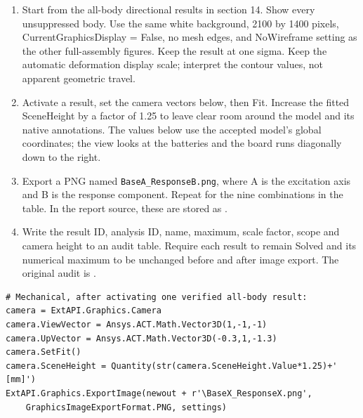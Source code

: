 \documentclass[10pt,a4paper]{article}
\begin{document}
\begin{enumerate}
\item Start from the all-body directional results in section 14. Show every unsuppressed body. Use the same white background, 2100 by 1400 pixels, CurrentGraphicsDisplay = False, no mesh edges, and NoWireframe setting as the other full-assembly figures. Keep the result at one sigma. Keep the automatic deformation display scale; interpret the contour values, not apparent geometric travel.
\item Activate a result, set the camera vectors below, then Fit. Increase the fitted SceneHeight by a factor of 1.25 to leave clear room around the model and its native annotations. The values below use the accepted model's global coordinates; the view looks at the batteries and the board runs diagonally down to the right.
\item Export a PNG named \texttt{BaseA\_ResponseB.png}, where A is the excitation axis and B is the response component. Repeat for the nine combinations in the table. In the report source, these are stored as .
\item Write the result ID, analysis ID, name, maximum, scale factor, scope and camera height to an audit table. Require each result to remain Solved and its numerical maximum to be unchanged before and after image export. The original audit is .
\end{enumerate}

\begin{lstlisting}
# Mechanical, after activating one verified all-body result:
camera = ExtAPI.Graphics.Camera
camera.ViewVector = Ansys.ACT.Math.Vector3D(1,-1,-1)
camera.UpVector = Ansys.ACT.Math.Vector3D(-0.3,1,-1.3)
camera.SetFit()
camera.SceneHeight = Quantity(str(camera.SceneHeight.Value*1.25)+' [mm]')
ExtAPI.Graphics.ExportImage(newout + r'\BaseX_ResponseX.png',
    GraphicsImageExportFormat.PNG, settings)
\end{lstlisting}
\end{document}
